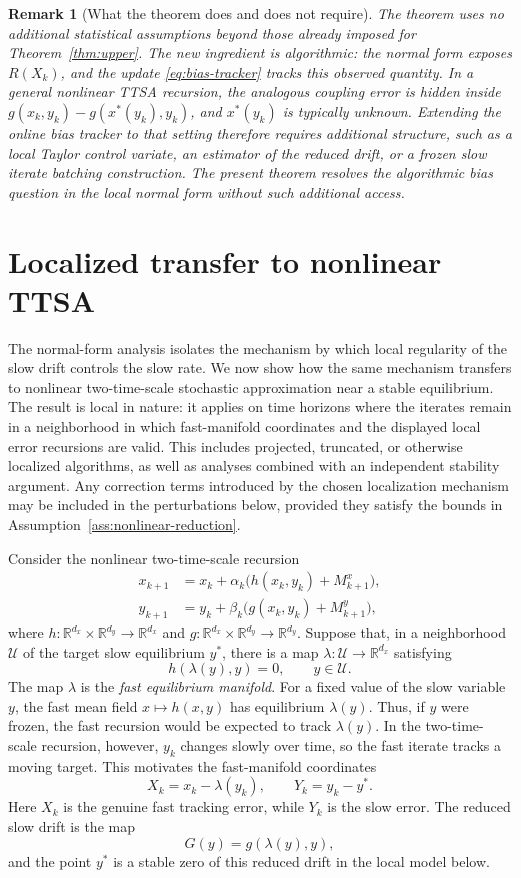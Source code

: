 \documentclass{article}
\newtheorem{remark}[theorem]{Remark}
\newcommand{\R}{\mathbb{R}}
\begin{document}
\begin{remark}[What the theorem does and does not require]
The theorem uses no additional statistical assumptions beyond those already imposed for Theorem~\ref{thm:upper}. The new ingredient is algorithmic: the normal form exposes $R(X_k)$, and the update \eqref{eq:bias-tracker} tracks this observed quantity. In a general nonlinear TTSA recursion, the analogous coupling error is hidden inside $g(x_k,y_k)-g(x^*(y_k),y_k)$, and $x^*(y_k)$ is typically unknown. Extending the online bias tracker to that setting therefore requires additional structure, such as a local Taylor control variate, an estimator of the reduced drift, or a frozen slow iterate batching construction. The present theorem resolves the algorithmic bias question in the local normal form without such additional access.
\end{remark}

\section{Localized transfer to nonlinear TTSA}
\label{sec:localized-transfer}

The normal-form analysis isolates the mechanism by which local regularity of the slow drift controls the slow rate. We now show how the same mechanism transfers to nonlinear two-time-scale stochastic approximation near a stable equilibrium. The result is local in nature: it applies on time horizons where the iterates remain in a neighborhood in which fast-manifold coordinates and the displayed local error recursions are valid. This includes projected, truncated, or otherwise localized algorithms, as well as analyses combined with an independent stability argument. Any correction terms introduced by the chosen localization mechanism may be included in the perturbations below, provided they satisfy the bounds in Assumption~\ref{ass:nonlinear-reduction}.

Consider the nonlinear two-time-scale recursion
\begin{align}
  x_{k+1} &= x_k+\alpha_k\big(h(x_k,y_k)+M^x_{k+1}\big), \label{eq:general-x}\\
  y_{k+1} &= y_k+\beta_k\big(g(x_k,y_k)+M^y_{k+1}\big), \label{eq:general-y}
\end{align}
where $h:\R^{d_x}\times\R^{d_y}\to\R^{d_x}$ and
$g:\R^{d_x}\times\R^{d_y}\to\R^{d_y}$. Suppose that, in a neighborhood
$\mathcal U$ of the target slow equilibrium $y^*$, there is a map
$\lambda:\mathcal U\to\R^{d_x}$ satisfying
\[
  h(\lambda(y),y)=0,
  \qquad y\in\mathcal U.
\]
The map $\lambda$ is the \emph{fast equilibrium manifold}. For a fixed value of the slow variable $y$, the fast mean field $x\mapsto h(x,y)$ has equilibrium $\lambda(y)$. Thus, if $y$ were frozen, the fast recursion would be expected to track $\lambda(y)$. In the two-time-scale recursion, however, $y_k$ changes slowly over time, so the fast iterate tracks a moving target. This motivates the fast-manifold coordinates
\[
  X_k=x_k-\lambda(y_k),
  \qquad
  Y_k=y_k-y^*.
\]
Here $X_k$ is the genuine fast tracking error, while $Y_k$ is the slow error. The reduced slow drift is the map
\[
  G(y)=g(\lambda(y),y),
\]
and the point $y^*$ is a stable zero of this reduced drift in the local model below.
\end{document}
